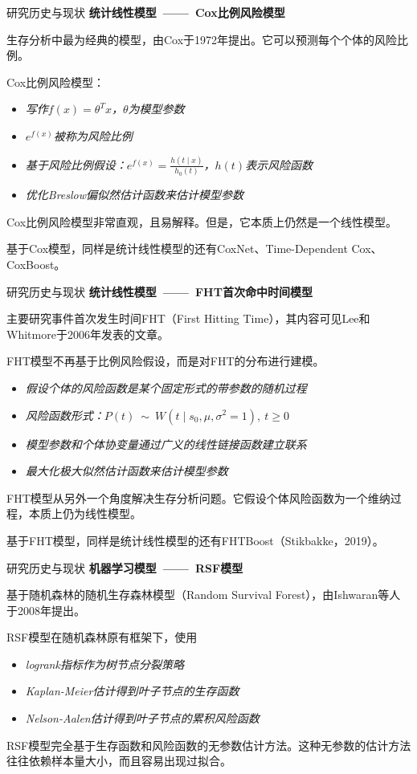 \documentclass[10pt]{beamer}
\begin{document}
\begin{frame}{研究历史与现状}
  \textbf{统计线性模型\ ——\ Cox比例风险模型}

  生存分析中最为经典的模型，由Cox于1972年提出。它可以预测每个个体的风险比例。
  
  Cox比例风险模型：
  \begin{itemize}
    \item \textit{写作$f(x)=\theta^T x$，$\theta$为模型参数}
    \item \textit{$e^{f(x)}$被称为风险比例}
    \item \textit{基于风险比例假设：$e^{f(x)} =\frac{h(t\mid x)}{h_0 (t)}$，$h(t)$表示风险函数}
    \item \textit{优化Breslow偏似然估计函数来估计模型参数}
  \end{itemize}

  Cox比例风险模型非常直观，且易解释。但是，它本质上仍然是一个线性模型。

  基于Cox模型，同样是统计线性模型的还有CoxNet、Time-Dependent Cox、CoxBoost。
\end{frame}

\begin{frame}{研究历史与现状}
  \textbf{统计线性模型\ ——\ FHT首次命中时间模型}

  主要研究事件首次发生时间FHT（First Hitting Time），其内容可见Lee和 Whitmore于2006年发表的文章。
  
  FHT模型不再基于比例风险假设，而是对FHT的分布进行建模。
  \begin{itemize}
    \item \textit{假设个体的风险函数是某个固定形式的带参数的随机过程}
    \item \textit{风险函数形式：$P(t)\ \sim \ W(t \mid s_0, \mu, \sigma^2=1),\ t\ge 0$}
    \item \textit{模型参数和个体协变量通过广义的线性链接函数建立联系}
    \item \textit{最大化极大似然估计函数来估计模型参数}
  \end{itemize}

  FHT模型从另外一个角度解决生存分析问题。它假设个体风险函数为一个维纳过程，本质上仍为线性模型。

  基于FHT模型，同样是统计线性模型的还有FHTBoost（Stikbakke，2019）。
\end{frame}

\begin{frame}{研究历史与现状}
  \textbf{机器学习模型\ ——\ RSF模型}

  基于随机森林的随机生存森林模型（Random Survival Forest），由Ishwaran等人于2008年提出。
  
  RSF模型在随机森林原有框架下，使用
  \begin{itemize}
    \item \textit{logrank指标作为树节点分裂策略}
    \item \textit{Kaplan­-Meier估计得到叶子节点的生存函数}
    \item \textit{Nelson­-Aalen估计得到叶子节点的累积风险函数}
  \end{itemize}

  RSF模型完全基于生存函数和风险函数的无参数估计方法。这种无参数的估计方法往往依赖样本量大小，而且容易出现过拟合。
\end{frame}
\end{document}
